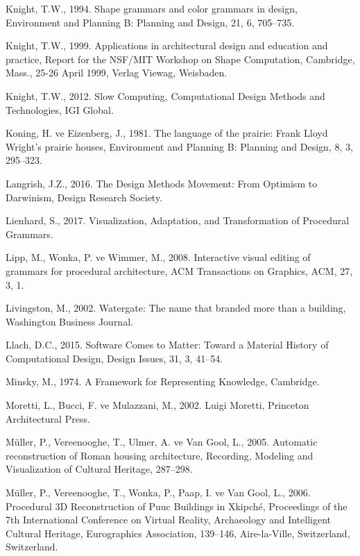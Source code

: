 \documentclass[12pt,turkish,a4paperpaper,]{report}
\begin{document}
\leavevmode\hypertarget{ref-Knight:1994hx}{}%
Knight, T.W., 1994. Shape grammars and color grammars in design,
Environment and Planning B: Planning and Design, 21, 6, 705--735.

\leavevmode\hypertarget{ref-Knight:1999uf}{}%
Knight, T.W., 1999. Applications in architectural design and education
and practice, Report for the NSF/MIT Workshop on Shape Computation,
Cambridge, Mass., 25-26 April 1999, Verlag Viewag, Weisbaden.

\leavevmode\hypertarget{ref-Knight:2012ue}{}%
Knight, T.W., 2012. Slow Computing, Computational Design Methods and
Technologies, IGI Global.

\leavevmode\hypertarget{ref-Koning:1981bd}{}%
Koning, H. ve Eizenberg, J., 1981. The language of the prairie: Frank
Lloyd Wright's prairie houses, Environment and Planning B: Planning and
Design, 8, 3, 295--323.

\leavevmode\hypertarget{ref-Langrish:2016tm}{}%
Langrish, J.Z., 2016. The Design Methods Movement: From Optimism to
Darwinism, Design Research Society.

\leavevmode\hypertarget{ref-Lienhard:2017jv}{}%
Lienhard, S., 2017. Visualization, Adaptation, and Transformation of
Procedural Grammars.

\leavevmode\hypertarget{ref-Lipp:2008hv}{}%
Lipp, M., Wonka, P. ve Wimmer, M., 2008. Interactive visual editing of
grammars for procedural architecture, ACM Transactions on Graphics, ACM,
27, 3, 1.

\leavevmode\hypertarget{ref-Livingston:2002wf}{}%
Livingston, M., 2002. Watergate: The name that branded more than a
building, Washington Business Journal.

\leavevmode\hypertarget{ref-Llach:2015ev}{}%
Llach, D.C., 2015. Software Comes to Matter: Toward a Material History
of Computational Design, Design Issues, 31, 3, 41--54.

\leavevmode\hypertarget{ref-Minsky:1974ut}{}%
Minsky, M., 1974. A Framework for Representing Knowledge, Cambridge.

\leavevmode\hypertarget{ref-Moretti:2002ve}{}%
Moretti, L., Bucci, F. ve Mulazzani, M., 2002. Luigi Moretti, Princeton
Architectural Press.

\leavevmode\hypertarget{ref-Muller:2005uf}{}%
Müller, P., Vereenooghe, T., Ulmer, A. ve Van Gool, L., 2005. Automatic
reconstruction of Roman housing architecture, Recording, Modeling and
Visualization of Cultural Heritage, 287--298.

\leavevmode\hypertarget{ref-Muller:2006hz}{}%
Müller, P., Vereenooghe, T., Wonka, P., Paap, I. ve Van Gool, L., 2006.
Procedural 3D Reconstruction of Puuc Buildings in Xkipché, Proceedings
of the 7th International Conference on Virtual Reality, Archaeology and
Intelligent Cultural Heritage, Eurographics Association, 139--146,
Aire-la-Ville, Switzerland, Switzerland.
\end{document}
